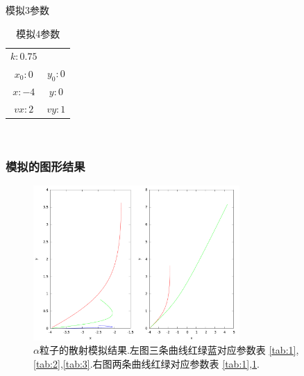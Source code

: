 \documentclass[10pt,a4paper]{article}
\begin{document}
\begin{table}[H]
\begin{minipage}[b]{0.2\linewidth}
\caption{模拟3参数}\label{tab:3}
\end{minipage}
\hspace{0.5cm}
\begin{minipage}[b]{0.2\linewidth}\centering
\begin{tabular}{cc}
\hline
$k: 0.75$ &\\
$x_0: 0$ &$y_0: 0$\\
$x: -4$ &$y: 0$\\
$vx: 2$&$vy: 1$\\
\hline
\end{tabular}\\

\caption{模拟4参数}\label{tab:4}
\end{minipage}
\end{table}

\subsubsection{模拟的图形结果}
\begin{figure}[H]
\centering
\includegraphics[width=0.7\textwidth]{../result/simulation3.png}
\caption{$\alpha$粒子的散射模拟结果.左图三条曲线红绿蓝对应参数表 \ref{tab:1},\ref{tab:2},\ref{tab:3}.右图两条曲线红绿对应参数表 \ref{tab:1},\ref{tab:4}.}
\end{figure}
\end{document}
